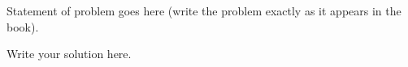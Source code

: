 \begin{problem}{4} 
    Statement of problem goes here (write the problem exactly as it appears in the book).
\end{problem}



\begin{sol}
    Write your solution here.
\end{sol}
